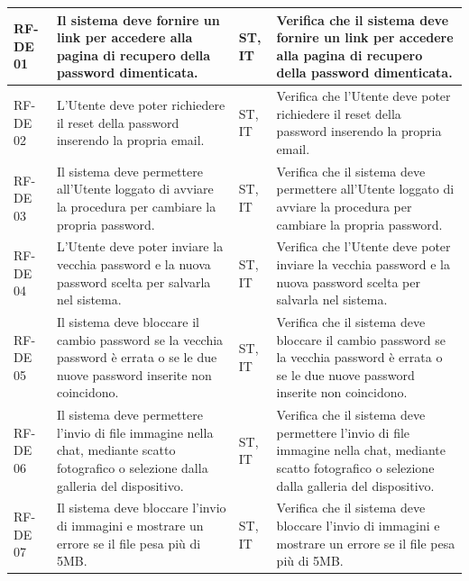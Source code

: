 \documentclass[a4paper,11pt,oneside]{scrartcl}
\begin{document}
\begin{longtable}{|p{1.5cm}|p{5.5cm}|p{1.8cm}|p{5cm}|}
    RF-DE 01         & Il sistema deve fornire un link per accedere alla pagina di recupero della password dimenticata.                                        & ST, IT             & Verifica che il sistema deve fornire un link per accedere alla pagina di recupero della password dimenticata.                                        \\ \hline
    RF-DE 02         & L'Utente deve poter richiedere il reset della password inserendo la propria email.                                                      & ST, IT             & Verifica che l'Utente deve poter richiedere il reset della password inserendo la propria email.                                                      \\ \hline
    RF-DE 03         & Il sistema deve permettere all'Utente loggato di avviare la procedura per cambiare la propria password.                                 & ST, IT             & Verifica che il sistema deve permettere all'Utente loggato di avviare la procedura per cambiare la propria password.                                 \\ \hline
    RF-DE 04         & L'Utente deve poter inviare la vecchia password e la nuova password scelta per salvarla nel sistema.                                    & ST, IT             & Verifica che l'Utente deve poter inviare la vecchia password e la nuova password scelta per salvarla nel sistema.                                    \\ \hline
    RF-DE 05         & Il sistema deve bloccare il cambio password se la vecchia password è errata o se le due nuove password inserite non coincidono.         & ST, IT             & Verifica che il sistema deve bloccare il cambio password se la vecchia password è errata o se le due nuove password inserite non coincidono.         \\ \hline
    RF-DE 06         & Il sistema deve permettere l'invio di file immagine nella chat, mediante scatto fotografico o selezione dalla galleria del dispositivo. & ST, IT             & Verifica che il sistema deve permettere l'invio di file immagine nella chat, mediante scatto fotografico o selezione dalla galleria del dispositivo. \\ \hline
    RF-DE 07         & Il sistema deve bloccare l'invio di immagini e mostrare un errore se il file pesa più di 5MB.                                           & ST, IT             & Verifica che il sistema deve bloccare l'invio di immagini e mostrare un errore se il file pesa più di 5MB.                                           \\ \hline

\end{longtable}
\end{document}
